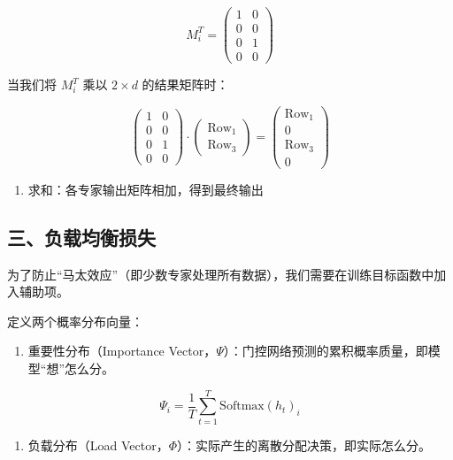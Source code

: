\[
M_i^T =
\begin{pmatrix}
1 & 0 \\
0 & 0 \\
0 & 1 \\
0 & 0
\end{pmatrix}
\]

当我们将 \(M_i^T\) 乘以 \(2 \times d\) 的结果矩阵时：

\[
\begin{pmatrix}
1 & 0 \\
0 & 0 \\
0 & 1 \\
0 & 0
\end{pmatrix}
\cdot
\begin{pmatrix}
\mathrm{Row}_1 \\
\mathrm{Row}_3
\end{pmatrix}
=
\begin{pmatrix}
\mathrm{Row}_1 \\
0 \\
\mathrm{Row}_3 \\
0
\end{pmatrix}
\]

\begin{enumerate}
\def\labelenumi{\arabic{enumi}.}
\setcounter{enumi}{3}
\tightlist
\item
  求和：各专家输出矩阵相加，得到最终输出
\end{enumerate}

\hypertarget{ux4e09ux8d1fux8f7dux5747ux8861ux635fux5931}{%
\subsection{三、负载均衡损失}\label{ux4e09ux8d1fux8f7dux5747ux8861ux635fux5931}}

为了防止``马太效应''（即少数专家处理所有数据），我们需要在训练目标函数中加入辅助项。

定义两个概率分布向量：

\begin{enumerate}
\def\labelenumi{\arabic{enumi}.}
\tightlist
\item
  重要性分布（Importance Vector，\(\Psi\)）：门控网络预测的累积概率质量，即模型``想''怎么分。
\end{enumerate}

\[
\Psi_i = \frac{1}{T}\sum_{t=1}^{T}\mathrm{Softmax}(h_t)_i
\]

\begin{enumerate}
\def\labelenumi{\arabic{enumi}.}
\setcounter{enumi}{1}
\tightlist
\item
  负载分布（Load Vector，\(\Phi\)）：实际产生的离散分配决策，即实际怎么分。
\end{enumerate}

